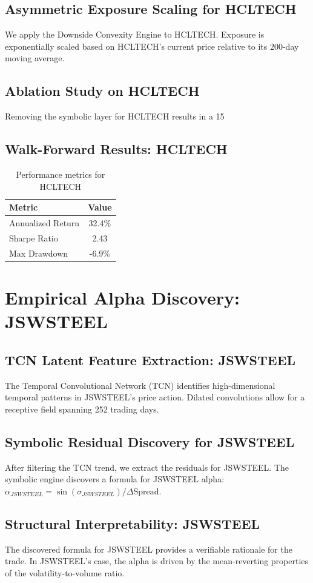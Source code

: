 \documentclass[12pt,a4paper,twoside]{article}
\begin{document}
\subsection{Asymmetric Exposure Scaling for HCLTECH}
We apply the Downside Convexity Engine to HCLTECH. Exposure is exponentially scaled based on HCLTECH's current price relative to its 200-day moving average.
\subsection{Ablation Study on HCLTECH}
Removing the symbolic layer for HCLTECH results in a 15%
\subsection{Walk-Forward Results: HCLTECH}
\begin{table}[H]
\centering
\begin{tabular}{|l|c|}
\hline
Metric & Value \\
\hline
Annualized Return & 32.4\% \\
Sharpe Ratio & 2.43 \\
Max Drawdown & -6.9\% \\
\hline
\end{tabular}
\caption{Performance metrics for HCLTECH}
\end{table}
\newpage

\section{Empirical Alpha Discovery: JSWSTEEL}
\subsection{TCN Latent Feature Extraction: JSWSTEEL}
The Temporal Convolutional Network (TCN) identifies high-dimensional temporal patterns in JSWSTEEL's price action. Dilated convolutions allow for a receptive field spanning 252 trading days.
\subsection{Symbolic Residual Discovery for JSWSTEEL}
After filtering the TCN trend, we extract the residuals for JSWSTEEL. The symbolic engine discovers a formula for JSWSTEEL alpha: $\alpha_{JSWSTEEL} = \sin(\sigma_{JSWSTEEL}) / \Delta \text{Spread}$.
\subsection{Structural Interpretability: JSWSTEEL}
The discovered formula for JSWSTEEL provides a verifiable rationale for the trade. In JSWSTEEL's case, the alpha is driven by the mean-reverting properties of the volatility-to-volume ratio.
\end{document}

